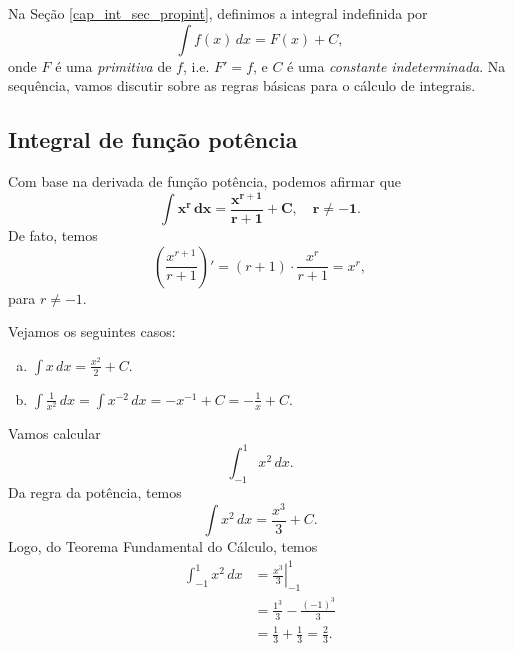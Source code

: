 Na Seção \ref{cap_int_sec_propint}, definimos a integral indefinida por
\begin{equation}
  \int f(x)\,dx = F(x) + C,
\end{equation}
onde $F$ é uma \emph{primitiva} de $f$, i.e. $F' = f$, e $C$ é uma \emph{constante indeterminada}. Na sequência, vamos discutir sobre as regras básicas para o cálculo de integrais.

\subsection{Integral de função potência}

Com base na derivada de função potência, podemos afirmar que
\begin{equation}
  \pmb{\int x^r\,dx = \frac{x^{r+1}}{r+1} + C,\quad r\neq -1}.
\end{equation}
De fato, temos
\begin{equation}
  \left(\frac{x^{r+1}}{r+1}\right)' = (r+1)\cdot \frac{x^r}{r+1} = x^r,
\end{equation}
para $r\neq -1$.

\begin{ex}
  Vejamos os seguintes casos:
  \begin{enumerate}[a)]
  \item $\displaystyle \int x\,dx = \frac{x^2}{2} + C$.
  \item $\displaystyle \int \frac{1}{x^2}\,dx = \int x^{-2}\,dx = -x^{-1} + C = -\frac{1}{x}+C$.
  \end{enumerate}
\end{ex}

\begin{ex}
  Vamos calcular
  \begin{equation}
    \int_{-1}^1 x^2\,dx.
  \end{equation}
  Da regra da potência, temos
  \begin{equation}
    \int x^2\,dx = \frac{x^3}{3} + C.
  \end{equation}
  Logo, do Teorema Fundamental do Cálculo, temos
  \begin{align}
    \int_{-1}^1 x^2\,dx &= \left.\frac{x^3}{3}\right|_{-1}^1 \\
                        &= \frac{1^3}{3} - \frac{(-1)^3}{3} \\
                        &= \frac{1}{3} + \frac{1}{3} = \frac{2}{3}.
  \end{align}
\end{ex}

